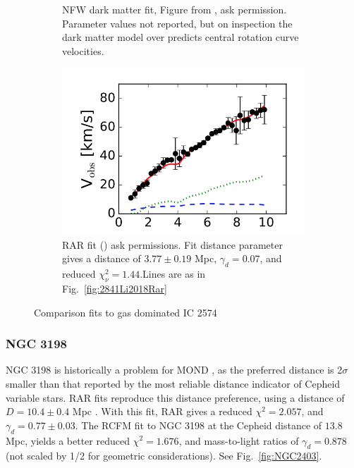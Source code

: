 \documentclass[reprint,%
 amsmath,amssymb,
 aps,
]{revtex4-1}
\begin{document}
\begin{figure}[ht]
\begin{subfigure}[b]{0.5\linewidth}
    \caption{NFW dark matter fit, Figure from \cite{2017MNRAS.471.1841N}, ask permission. Parameter values not reported, but on inspection the dark matter model over predicts central rotation curve velocities.} 
    \label{fig:Nav17} 
    \vspace{4ex}
  \end{subfigure} 
    \begin{subfigure}[b]{0.5\linewidth}
    \centering
    \includegraphics[width=0.95\linewidth]{figures/IC2574_Li.png} 
    \caption{  RAR fit (\cite{Li_2018})   ask permissions. Fit distance parameter gives a distance of $3.77 \pm 0.19$ Mpc, $\gamma_d =0.07 $, and reduced $\chi^2_\nu = 1.44$.Lines are as in Fig.~\ref{fig:2841Li2018Rar}} 
    \label{fig:Nav17} 
    \vspace{4ex}
  \end{subfigure} 
  \caption{ Comparison
fits to   gas dominated IC 2574  }
  \label{fig:CompareIC2574} 
\end{figure}

\subsubsection{NGC 3198}

  NGC 3198 is historically a problem  for MOND
\cite{Gent}, as the preferred distance is 2$\sigma$ smaller than that reported by the most reliable distance indicator of Cepheid variable stars. RAR fits reproduce this distance preference, using a distance of
$ D = 10.4 \pm 0.4$ Mpc  \cite{Li_2018}. With this fit,  RAR gives a reduced
$\chi^2 = 2.057$, and $\gamma_d = 0.77 \pm 0.03$. The RCFM fit to  NGC 3198 at the Cepheid  distance  of 
$13.8$ Mpc, yields  a better reduced $\chi^2 = 1.676$, and mass-to-light ratios of  $\gamma_d = 0.878$(not scaled by 1/2 for geometric considerations).   See Fig.~\ref{fig:NGC2403}. 
\end{document}
